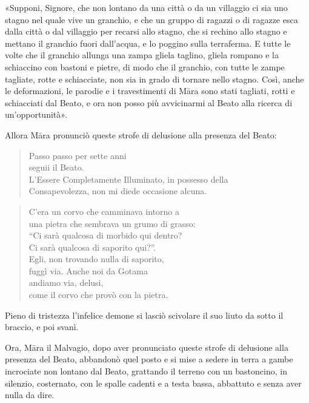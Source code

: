 «Supponi, Signore, che non lontano da una città o da un villaggio ci sia
uno stagno nel quale vive un granchio, e che un gruppo di ragazzi o di
ragazze esca dalla città o dal villaggio per recarsi allo stagno, che si
rechino allo stagno e mettano il granchio fuori dall’acqua, e lo poggino
sulla terraferma. E tutte le volte che il granchio allunga una zampa
gliela taglino, gliela rompano e la schiaccino con bastoni e pietre, di
modo che il granchio, con tutte le zampe tagliate, rotte e schiacciate,
non sia in grado di tornare nello stagno. Così, anche le deformazioni,
le parodie e i travestimenti di Māra sono stati tagliati, rotti e
schiacciati dal Beato, e ora non posso più avvicinarmi al Beato alla
ricerca di un’opportunità».


Allora Māra pronunciò queste strofe di delusione alla presenza del
Beato:




\begin{quote}
Passo passo per sette anni \\
seguii il Beato. \\
L’Essere Completamente Illuminato, in possesso della \\
Consapevolezza, non mi diede occasione alcuna.
\end{quote}



\begin{quote}
C’era un \label{pag70A}corvo che camminava intorno a \\
una pietra che sembrava un grumo di grasso: \\
“Ci sarà qualcosa di morbido qui dentro? \\
Ci sarà qualcosa di saporito qui?”. \\
Egli, non trovando nulla di saporito, \\
fuggì via. Anche noi da Gotama \\
andiamo via, delusi, \\
come il corvo che provò con la pietra.
\end{quote}

Pieno di tristezza l’infelice demone si lasciò scivolare il suo liuto da
sotto il braccio, e poi svanì.




Ora, Māra il Malvagio, dopo aver pronunciato queste strofe di delusione
alla presenza del Beato, abbandonò quel posto e si mise a sedere in
terra a gambe incrociate non lontano dal Beato, grattando il terreno con
un bastoncino, in silenzio, costernato, con le spalle cadenti e a testa
bassa, abbattuto e senza aver nulla da dire.


